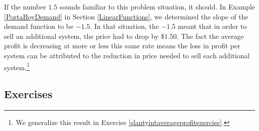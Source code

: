 \documentclass{ximera}
\begin{document}
\begin{example}
\begin{explanation}
\begin{enumerate}
If the number $1.5$ sounds familiar to this problem situation, it should.  In Example \ref{PortaBoyDemand} in Section \ref{LinearFunctions}, we determined the slope of the demand function to be $-1.5$. In that situation, the $-1.5$ meant that in order to sell an additional system, the price had to drop by $\$ 1.50$.  The fact the average profit is decreasing at more or less this same rate means the loss in profit per system can be attributed to the reduction in price needed to sell each additional system.\footnote{We generalize this result in Exercise \ref{slantyintaverageprofitexercise}.} 

\end{enumerate}

\end{explanation}
\end{example}

\newpage

\subsection{Exercises}


\closegraphsfile
\end{document}
